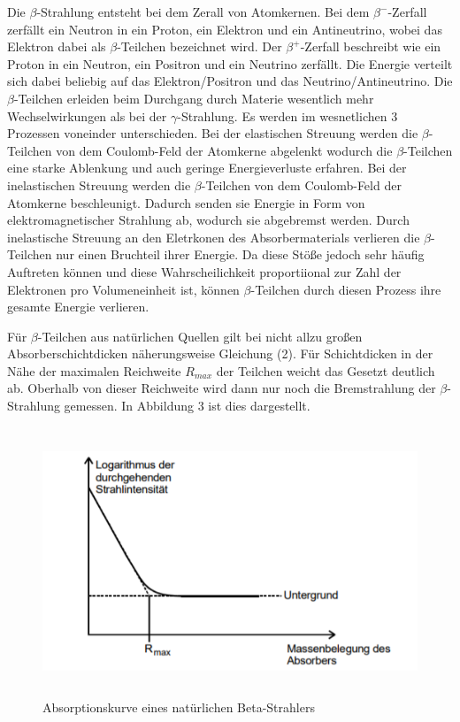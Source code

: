Die $\beta$-Strahlung entsteht bei dem Zerall von Atomkernen. Bei dem $\beta^{-}$-Zerfall zerfällt ein Neutron in ein Proton, ein Elektron
und ein Antineutrino, wobei das Elektron dabei als $\beta$-Teilchen bezeichnet wird. Der $\beta^{+}$-Zerfall beschreibt wie ein Proton in ein
Neutron, ein Positron und ein Neutrino zerfällt.
Die Energie verteilt sich dabei beliebig
auf das Elektron/Positron und das Neutrino/Antineutrino.
Die $\beta$-Teilchen erleiden beim Durchgang durch Materie wesentlich mehr Wechselwirkungen als bei der $\gamma$-Strahlung. Es werden
im wesnetlichen 3 Prozessen voneinder unterschieden. Bei der elastischen Streuung werden die $\beta$-Teilchen von dem
Coulomb-Feld der Atomkerne abgelenkt wodurch die $\beta$-Teilchen eine starke Ablenkung und auch geringe Energieverluste erfahren.
Bei der inelastischen Streuung werden die $\beta$-Teilchen von dem Coulomb-Feld der Atomkerne beschleunigt. Dadurch senden sie
Energie in Form von elektromagnetischer Strahlung ab, wodurch sie abgebremst werden.
Durch inelastische Streuung an den Eletrkonen des Absorbermaterials verlieren die $\beta$-Teilchen nur einen Bruchteil
ihrer Energie. Da diese Stöße jedoch sehr häufig Auftreten können und diese Wahrscheilichkeit proportiional zur Zahl der
Elektronen pro Volumeneinheit ist, können $\beta$-Teilchen durch diesen Prozess ihre gesamte Energie verlieren.

Für $\beta$-Teilchen aus natürlichen Quellen gilt bei nicht allzu großen Absorberschichtdicken näherungsweise Gleichung (2). Für
Schichtdicken in der Nähe der maximalen Reichweite $R_{max}$ der Teilchen weicht das Gesetzt deutlich ab. Oberhalb von dieser
Reichweite wird dann nur noch die Bremstrahlung der $\beta$-Strahlung gemessen. In Abbildung 3 ist dies dargestellt.

\begin{figure}[H]
  \centering
  \includegraphics[height=8cm]{absorptionskurve.PNG}
  \caption{Absorptionskurve eines natürlichen Beta-Strahlers \cite{sample}}
  \label{fig:Linienspektrum}
\end{figure}

